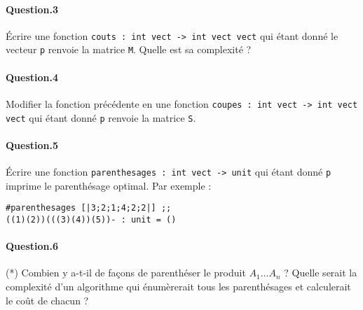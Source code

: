 \documentclass[10pt,a4paper]{article}
\begin{document}
\paragraph{Question.3} Écrire une fonction \texttt{couts : int vect -> int vect vect}
qui étant donné le vecteur \texttt{p} renvoie la matrice \texttt{M}. Quelle est
sa complexité ?

\paragraph{Question.4} Modifier la fonction précédente en une fonction 
\texttt{coupes : int vect -> int vect vect} qui étant donné \texttt{p} renvoie
la matrice \texttt{S}.

\paragraph{Question.5} Écrire une fonction \texttt{parenthesages : int vect -> unit}
qui étant donné \texttt{p} imprime le parenthésage optimal. Par exemple :
\begin{verbatim}#parenthesages [|3;2;1;4;2;2|] ;;
((1)(2))(((3)(4))(5))- : unit = () \end{verbatim}

\paragraph{Question.6} (*) Combien y a-t-il de façons de parenthéser le produit
$A_1 \dots A_n$ ? Quelle serait la complexité d'un algorithme qui énumèrerait
tous les parenthésages et calculerait le coût de chacun ?
\end{document}
